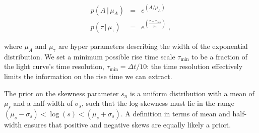 \documentclass[12pt]{emulateapj}
\newcommand{\given}{\,|\,}
\begin{document}

\begin{eqnarray}
p(A \given \mu_A) &=& e^{(A/\mu_A)} \\
p(\tau \given \mu_{\tau}) & = & e^{(\frac{\tau - \tau_{\mathrm{min}}}{\mu_{\mathrm{\tau}}})} \; ,
\end{eqnarray}

where $\mu_A$ and $\mu_{\mathrm{\tau}}$ are hyper parameters describing the width of the exponential distribution.
We set a minimum possible rise time scale $\tau_{\mathrm{min}}$ to be a fraction of the light curve's time resolution,
$\tau_{\mathrm{min}} = \Delta t/10$: the time resolution effectively limits the information on the rise time we can extract.

The prior on the skewness parameter $s_n$ is a uniform distribution with a mean of $\mu_s$ and a half-width of $\sigma_s$, such
that the log-skewness must lie in the range $(\mu_s-\sigma_s) < \log{(s)} < (\mu_s+\sigma_s)$. A definition in terms of mean and half-width ensures
that positive and negative skews are equally likely a priori. 
\end{document}
